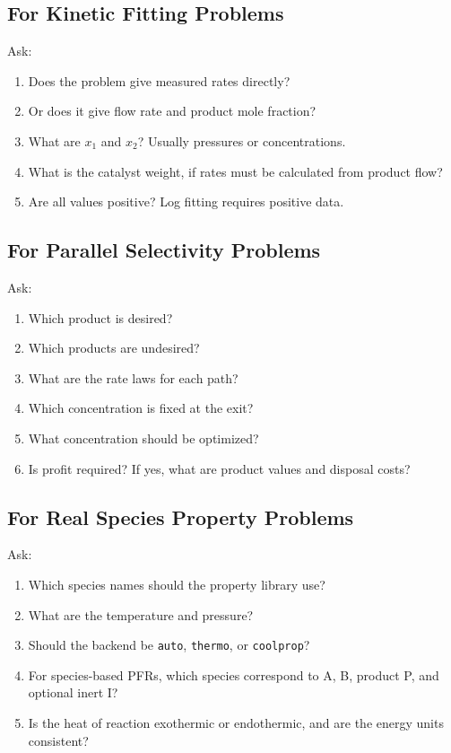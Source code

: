 \documentclass[11pt]{article}
\begin{document}
\subsection{For Kinetic Fitting Problems}

Ask:

\begin{enumerate}
    \item Does the problem give measured rates directly?
    \item Or does it give flow rate and product mole fraction?
    \item What are $x_1$ and $x_2$? Usually pressures or concentrations.
    \item What is the catalyst weight, if rates must be calculated from product flow?
    \item Are all values positive? Log fitting requires positive data.
\end{enumerate}

\subsection{For Parallel Selectivity Problems}

Ask:

\begin{enumerate}
    \item Which product is desired?
    \item Which products are undesired?
    \item What are the rate laws for each path?
    \item Which concentration is fixed at the exit?
    \item What concentration should be optimized?
    \item Is profit required? If yes, what are product values and disposal costs?
\end{enumerate}

\subsection{For Real Species Property Problems}

Ask:

\begin{enumerate}
    \item Which species names should the property library use?
    \item What are the temperature and pressure?
    \item Should the backend be \texttt{auto}, \texttt{thermo}, or \texttt{coolprop}?
    \item For species-based PFRs, which species correspond to A, B, product P, and optional inert I?
    \item Is the heat of reaction exothermic or endothermic, and are the energy units consistent?
\end{enumerate}
\end{document}
